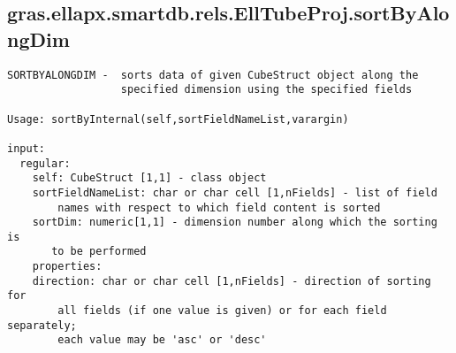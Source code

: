 \subsection{\texorpdfstring{gras.ellapx.smartdb.rels.EllTubeProj.sortByAlongDim}{sortByAlongDim}}\label{method:gras.ellapx.smartdb.rels.EllTubeProj.sortByAlongDim}
\begin{verbatim}
SORTBYALONGDIM -  sorts data of given CubeStruct object along the
                  specified dimension using the specified fields

Usage: sortByInternal(self,sortFieldNameList,varargin)

input:
  regular:
    self: CubeStruct [1,1] - class object
    sortFieldNameList: char or char cell [1,nFields] - list of field
        names with respect to which field content is sorted
    sortDim: numeric[1,1] - dimension number along which the sorting is
       to be performed
    properties:
    direction: char or char cell [1,nFields] - direction of sorting for
        all fields (if one value is given) or for each field separately;
        each value may be 'asc' or 'desc'
\end{verbatim}
